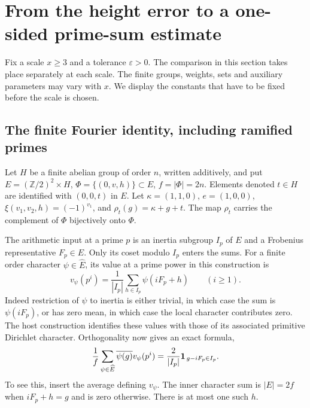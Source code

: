 \section{From the height error to a one-sided prime-sum estimate}
\label{sec:primecomparison}

Fix a scale \(x\geq3\) and a tolerance \(\varepsilon>0\).
The comparison in this section takes place separately at each scale.
The finite groups, weights, sets and auxiliary parameters may vary
with \(x\). We display the constants that have to be fixed before the
scale is chosen.

\subsection{The finite Fourier identity, including ramified primes}

Let \(H\) be a finite abelian group of order \(n\), written additively,
and put \(E=(\mathbb Z/2)^2\times H\),
\(\Phi=\{(0,v,h)\}\subset E\), \(f=|\Phi|=2n\).
Elements denoted \(t\in H\) are identified with \((0,0,t)\) in \(E\).
Let \(\kappa=(1,1,0)\), \(e=(1,0,0)\),
\(\xi(v_1,v_2,h)=(-1)^{v_1}\), and
\(\rho_t(g)=\kappa+g+t\). The map \(\rho_t\) carries the
complement of \(\Phi\) bijectively onto \(\Phi\).

The arithmetic input at a prime \(p\) is an inertia subgroup \(I_p\)
of \(E\) and a Frobenius representative \(F_p\in E\). Only its
coset modulo \(I_p\) enters the sums. For a finite order character
\(\psi\in\widehat E\), its value at a prime power in this construction is
\[
 v_\psi(p^i)=\frac1{|I_p|}\sum_{h\in I_p}\psi(iF_p+h)
 \qquad(i\geq1).
\]
Indeed restriction of \(\psi\) to inertia is either trivial, in
which case the sum is \(\psi(iF_p)\), or has zero mean, in which
case the local character contributes zero. The host construction
identifies these values with those of its associated primitive
Dirichlet character. Orthogonality now gives an exact formula,
\begin{equation}
 \frac1f\sum_{\psi\in\widehat E}\overline{\psi(g)}v_\psi(p^i)
 =\frac{2}{|I_p|}{\bf1}_{\,g-iF_p\in I_p}.
 \label{eq:pc-inertia}
\end{equation}
To see this, insert the average defining \(v_\psi\). The inner
character sum is \(|E|=2f\) when \(iF_p+h=g\) and is zero otherwise.
There is at most one such \(h\).

